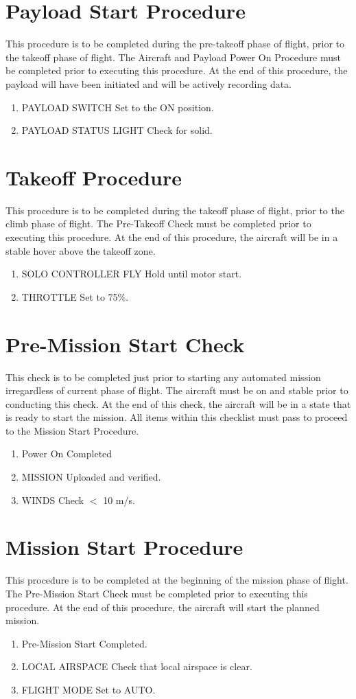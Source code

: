 \documentclass{report}
\begin{document}
	\section{Payload Start Procedure}
		This procedure is to be completed during the pre-takeoff phase of flight, prior to the takeoff phase of flight.  The Aircraft and Payload Power On Procedure must be completed prior to executing this procedure.  At the end of this procedure, the payload will have been initiated and will be actively recording data.
		\begin{enumerate}
			\item PAYLOAD SWITCH \hrulefill Set to the ON position.
			\item PAYLOAD STATUS LIGHT \hrulefill Check for solid.
		\end{enumerate}
	\section{Takeoff Procedure}
		This procedure is to be completed during the takeoff phase of flight, prior to the climb phase of flight.  The Pre-Takeoff Check must be completed prior to executing this procedure.  At the end of this procedure, the aircraft will be in a stable hover above the takeoff zone.
		\begin{enumerate}
			\item SOLO CONTROLLER FLY \hrulefill Hold until motor start.
			\item THROTTLE \hrulefill Set to 75\%.
		\end{enumerate}
	\section{Pre-Mission Start Check}
		This check is to be completed just prior to starting any automated mission irregardless of current phase of flight.  The aircraft must be on and stable prior to conducting this check.  At the end of this check, the aircraft will be in a state that is ready to start the mission.  All items within this checklist must pass to proceed to the Mission Start Procedure.
		\begin{enumerate}
			\item Power On \hrulefill Completed
			\item MISSION \hrulefill Uploaded and verified.
			\item WINDS \hrulefill Check $<$ 10 m/s.
		\end{enumerate}
	\section{Mission Start Procedure}
		This procedure is to be completed at the beginning of the mission phase of flight.  The Pre-Mission Start Check must be completed prior to executing this procedure.  At the end of this procedure, the aircraft will start the planned mission.
		\begin{enumerate}
			\item Pre-Mission Start \hrulefill Completed.
			\item LOCAL AIRSPACE \hrulefill Check that local airspace is clear.
			\item FLIGHT MODE \hrulefill Set to AUTO.
		\end{enumerate}
\end{document}

